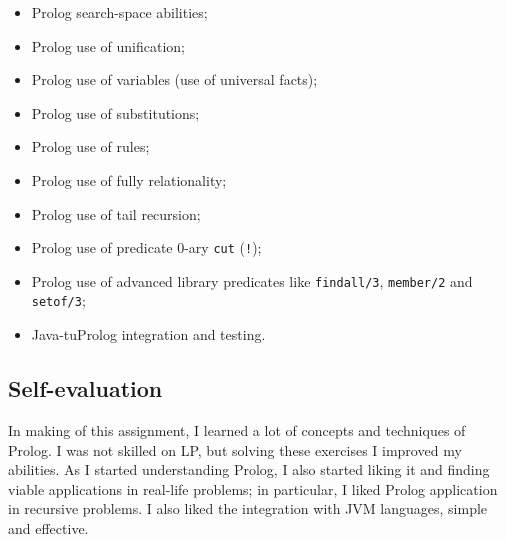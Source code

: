         \begin{itemize}
            \item Prolog search-space abilities;
            \item Prolog use of unification;
            \item Prolog use of variables (use of universal facts);
            \item Prolog use of substitutions;
            \item Prolog use of rules;
            \item Prolog use of fully relationality;
            \item Prolog use of tail recursion;
            \item Prolog use of predicate 0-ary \texttt{cut} (\texttt{!});
            \item Prolog use of advanced library predicates like \texttt{findall/3}, \texttt{member/2} and \texttt{setof/3};
            \item Java-tuProlog integration and testing.
        \end{itemize}

    \subsection*{Self-evaluation}
        In making of this assignment, I learned a lot of concepts and techniques of Prolog. 
        I was not skilled on LP, but solving these exercises I improved my abilities. 
        As I started understanding Prolog, I also started liking it and finding viable applications in real-life problems;
        in particular, I liked Prolog application in recursive problems.
        I also liked the integration with JVM languages, simple and effective.
 

    
    
